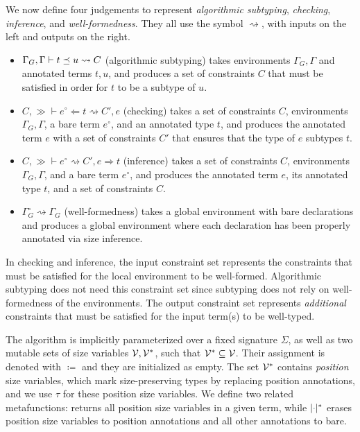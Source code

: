 We now define four judgements to represent \emph{algorithmic subtyping}, \emph{checking}, \emph{inference}, and \emph{well-formed\-ness}.
They all use the symbol $\rightsquigarrow$, with inputs on the left and outputs on the right.
\begin{itemize}
  \item $\Gamma_G, \Gamma \vdash t \preceq u \rightsquigarrow C$ (algorithmic subtyping) takes environments $\Gamma_G, \Gamma$ and annotated terms $t, u$, and produces a set of constraints $C$ that must be satisfied in order for $t$ to be a subtype of $u$.
  \item $C, \gg \vdash e^\circ \Leftarrow t \rightsquigarrow C', e$ (checking)
  takes a set of constraints $C$, environments $\Gamma_G, \Gamma$,
  a bare term $e^\circ$, and an annotated type $t$,
  and produces the annotated term $e$ with a set of constraints $C'$
  that ensures that the type of $e$ subtypes $t$.
  \item $C, \gg \vdash e^\circ \rightsquigarrow C', e \Rightarrow t$ (inference)
  takes a set of constraints $C$, environments $\Gamma_G, \Gamma$,
  and a bare term $e^\circ$, and produces the annotated term $e$, its annotated type $t$, and a set of constraints $C$.
  \item $\Gamma_G^\circ \rightsquigarrow \Gamma_G$ (well-formedness) takes a global environment with bare declarations and produces a global environment where each declaration has been properly annotated via size inference.
\end{itemize}

In checking and inference, the input constraint set represents the constraints that must be satisfied
for the local environment to be well-formed.
Algorithmic subtyping does not need this constraint set since subtyping does not rely on well-formedness of the environments.
The output constraint set represents \emph{additional} constraints that must be satisfied
for the input term(s) to be well-typed.

The algorithm is implicitly parameterized over a fixed signature $\Sigma$,
as well as two mutable sets of size variables $\mathcal{V}, \mathcal{V}^*$, such that $\mathcal{V}^* \subseteq \mathcal{V}$.
Their assignment is denoted with $\coloneqq$ and they are initialized as empty.
The set $\mathcal{V}^*$ contains \textit{position} size variables,
which mark size-preserving types by replacing position annotations,
and we use $\tau$ for these position size variables.
We define two related metafunctions: \PV returns all position size variables in a given term,
while $\erase{\ph}^*$ erases position size variables to position annotations and all other annotations to bare.

